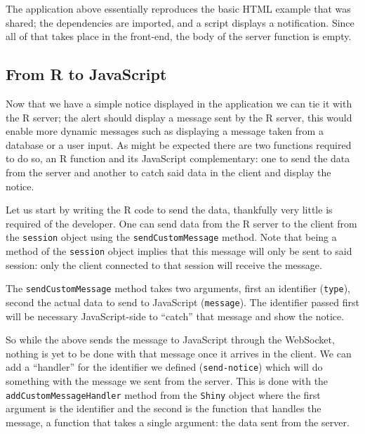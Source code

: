 \documentclass[
]{krantz}
\makeatletter
\newenvironment{Shaded}{\begin{snugshade}}{\end{snugshade}}
\newcommand{\CommentTok}[1]{\textcolor[rgb]{0.37,0.37,0.37}{\textit{#1}}}
\newcommand{\ControlFlowTok}[1]{\textcolor[rgb]{0.27,0.27,0.27}{\textbf{#1}}}
\newcommand{\DataTypeTok}[1]{\textcolor[rgb]{0.27,0.27,0.27}{#1}}
\newcommand{\KeywordTok}[1]{\textcolor[rgb]{0.27,0.27,0.27}{\textbf{#1}}}
\newcommand{\NormalTok}[1]{#1}
\newcommand{\OperatorTok}[1]{\textcolor[rgb]{0.43,0.43,0.43}{\textbf{#1}}}
\newcommand{\StringTok}[1]{\textcolor[rgb]{0.5,0.5,0.5}{#1}}
\newenvironment{kframe}{%
\medskip{}
\setlength{\fboxsep}{.8em}
 \def\at@end@of@kframe{}%
 \ifinner\ifhmode%
  \def\at@end@of@kframe{\end{minipage}}%
  \begin{minipage}{\columnwidth}%
 \fi\fi%
 \def\FrameCommand##1{\hskip\@totalleftmargin \hskip-\fboxsep
 \colorbox{shadecolor}{##1}\hskip-\fboxsep
     \hskip-\linewidth \hskip-\@totalleftmargin \hskip\columnwidth}%
 \MakeFramed {\advance\hsize-\width
   \@totalleftmargin\z@ \linewidth\hsize
   \@setminipage}}%
 {\par\unskip\endMakeFramed%
 \at@end@of@kframe}
\renewenvironment{Shaded}{\begin{kframe}}{\end{kframe}}
\makeatother
\begin{document}
The application above essentially reproduces the basic HTML example that was shared; the dependencies are imported, and a script displays a notification. Since all of that takes place in the front-end, the body of the server function is empty.

\hypertarget{shiny-intro-r-to-js}{%
\subsection{From R to JavaScript}\label{shiny-intro-r-to-js}}

Now that we have a simple notice displayed in the application we can tie it with the R server; the alert should display a message sent by the R server, this would enable more dynamic messages such as displaying a message taken from a database or a user input. As might be expected there are two functions required to do so, an R function and its JavaScript complementary: one to send the data from the server and another to catch said data in the client and display the notice.

Let us start by writing the R code to send the data, thankfully very little is required of the developer. One can send data from the R server to the client from the \texttt{session} object using the \texttt{sendCustomMessage} method. Note that being a method of the \texttt{session} object implies that this message will only be sent to said session: only the client connected to that session will receive the message.

The \texttt{sendCustomMessage} method takes two arguments, first an identifier (\texttt{type}), second the actual data to send to JavaScript (\texttt{message}). The identifier passed first will be necessary JavaScript-side to ``catch'' that message and show the notice.

\begin{Shaded}
\end{Shaded}

So while the above sends the message to JavaScript through the WebSocket, nothing is yet to be done with that message once it arrives in the client. We can add a ``handler'' for the identifier we defined (\texttt{send-notice}) which will do something with the message we sent from the server. This is done with the \texttt{addCustomMessageHandler} method from the \texttt{Shiny} object where the first argument is the identifier and the second is the function that handles the message, a function that takes a single argument: the data sent from the server.
\end{document}
